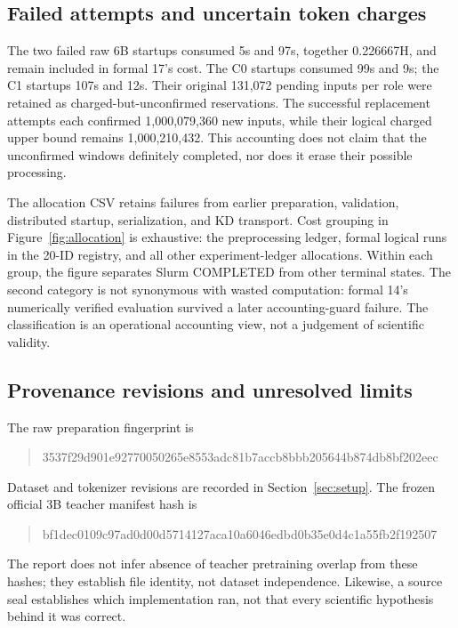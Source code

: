 \subsection{Failed attempts and uncertain token charges}

The two failed raw 6B startups consumed 5s and 97s, together 0.226667H, and remain included in formal 17's cost. The C0 startups consumed 99s and 9s; the C1 startups 107s and 12s. Their original 131,072 pending inputs per role were retained as charged-but-unconfirmed reservations. The successful replacement attempts each confirmed 1,000,079,360 new inputs, while their logical charged upper bound remains 1,000,210,432. This accounting does not claim that the unconfirmed windows definitely completed, nor does it erase their possible processing.

The allocation CSV retains failures from earlier preparation, validation, distributed startup, serialization, and KD transport. Cost grouping in Figure~\ref{fig:allocation} is exhaustive: the preprocessing ledger, formal logical runs in the 20-ID registry, and all other experiment-ledger allocations. Within each group, the figure separates Slurm COMPLETED from other terminal states. The second category is not synonymous with wasted computation: formal 14's numerically verified evaluation survived a later accounting-guard failure. The classification is an operational accounting view, not a judgement of scientific validity.


\subsection{Provenance revisions and unresolved limits}

The raw preparation fingerprint is
\begin{quote}\small\ttfamily
3537f29d901e92770050265e8553adc81b7accb8bbb205644b874db8bf202eec
\end{quote}
Dataset and tokenizer revisions are recorded in Section~\ref{sec:setup}. The frozen official 3B teacher manifest hash is
\begin{quote}\small\ttfamily
bf1dec0109c97ad0d00d5714127aca10a6046edbd0b35e0d4c1a55fb2f192507
\end{quote}
The report does not infer absence of teacher pretraining overlap from these hashes; they establish file identity, not dataset independence. Likewise, a source seal establishes which implementation ran, not that every scientific hypothesis behind it was correct.

